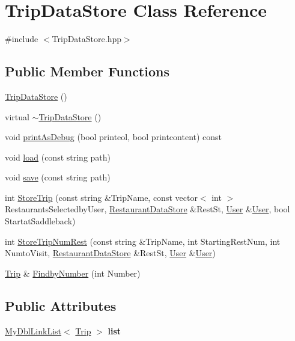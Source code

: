 \hypertarget{classTripDataStore}{\section{Trip\-Data\-Store Class Reference}
\label{classTripDataStore}
}


{\ttfamily \#include $<$Trip\-Data\-Store.\-hpp$>$}

\subsection*{Public Member Functions}
\begin{DoxyCompactItemize}
\item 
\hyperlink{classTripDataStore_a6ecb3b38f615cdf3a95699b75e070f64}{Trip\-Data\-Store} ()
\item 
virtual \hyperlink{classTripDataStore_abcc0808ffac99fce3d20fec2e6b037db}{$\sim$\-Trip\-Data\-Store} ()
\item 
void \hyperlink{classTripDataStore_a3e0428a62b180370acca3cef17236a13}{print\-As\-Debug} (bool printeol, bool printcontent) const 
\item 
void \hyperlink{classTripDataStore_a6b04d48e105f786d28a6b1c237d0d6c7}{load} (const string path)
\item 
void \hyperlink{classTripDataStore_ac694428dda496c811b1e46a2b206d0cd}{save} (const string path)
\item 
int \hyperlink{classTripDataStore_a45a7c93b2899cf0b7bf070324d686c36}{Store\-Trip} (const string \&Trip\-Name, const vector$<$ int $>$ Restaurants\-Selectedby\-User, \hyperlink{classRestaurantDataStore}{Restaurant\-Data\-Store} \&Rest\-St, \hyperlink{classUser}{User} \&\hyperlink{classUser}{User}, bool Startat\-Saddleback)
\item 
int \hyperlink{classTripDataStore_aef773f76a25496d624c8f7443ab393bc}{Store\-Trip\-Num\-Rest} (const string \&Trip\-Name, int Starting\-Rest\-Num, int Numto\-Visit, \hyperlink{classRestaurantDataStore}{Restaurant\-Data\-Store} \&Rest\-St, \hyperlink{classUser}{User} \&\hyperlink{classUser}{User})
\item 
\hyperlink{classTrip}{Trip} \& \hyperlink{classTripDataStore_a1326494915eee638e4eedbdd6bb0c09b}{Findby\-Number} (int Number)
\end{DoxyCompactItemize}
\subsection*{Public Attributes}
\begin{DoxyCompactItemize}
\item 
\hypertarget{classTripDataStore_a75cb59c927937a86ba9ddeb304a1e4f5}{\hyperlink{classnsMyDblLinkList_1_1MyDblLinkList}{My\-Dbl\-Link\-List}$<$ \hyperlink{classTrip}{Trip} $>$ {\bfseries list}}\label{classTripDataStore_a75cb59c927937a86ba9ddeb304a1e4f5}

\end{DoxyCompactItemize}


